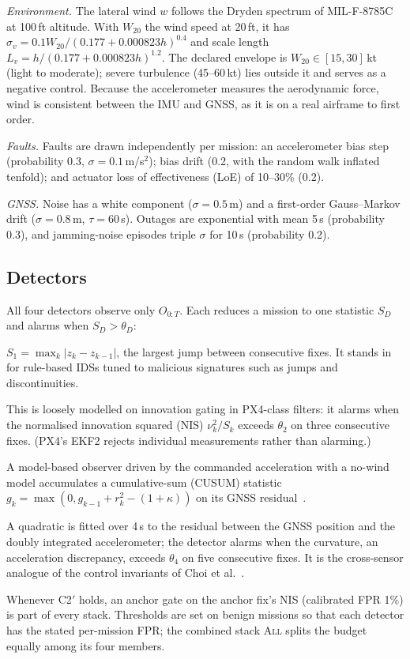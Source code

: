 \documentclass[letterpaper,twocolumn,10pt]{article}
\theoremstyle{remark}
\begin{document}
\emph{Environment.} The lateral wind $w$ follows the Dryden spectrum of
MIL-F-8785C at 100\,ft altitude. With $W_{20}$ the wind speed at 20\,ft, it has
$\sigma_v=0.1W_{20}/(0.177+0.000823h)^{0.4}$ and scale length
$L_v=h/(0.177+0.000823h)^{1.2}$. The declared envelope is
$W_{20}\in[15,30]$\,kt (light to moderate); severe turbulence (45--60\,kt) lies
outside it and serves as a negative control. Because the accelerometer measures
the aerodynamic force, wind is consistent between the IMU and GNSS, as it is on
a real airframe to first order.

\emph{Faults.} Faults are drawn independently per mission: an accelerometer bias
step (probability 0.3, $\sigma=0.1$\,m/s$^2$); bias drift (0.2, with the random
walk inflated tenfold); and actuator loss of effectiveness (LoE) of 10--30\%
(0.2).

\emph{GNSS.} Noise has a white component ($\sigma=0.5$\,m) and a first-order
Gauss--Markov drift ($\sigma=0.8$\,m, $\tau=60$\,s). Outages are
exponential with mean 5\,s (probability 0.3), and jamming-noise episodes
triple $\sigma$ for 10\,s (probability 0.2).

\subsection{Detectors}
All four detectors observe only $O_{0:T}$. Each reduces a mission to one
statistic $S_D$ and alarms when $S_D>\theta_D$:
\begin{description}[leftmargin=1em,style=nextline]
\item[D1, signature monitor.] $S_1=\max_k|z_k-z_{k-1}|$, the largest jump between
  consecutive fixes. It stands in for rule-based IDSs tuned to malicious
  signatures such as jumps and discontinuities.
\item[D2, $\chi^2$ innovation gate.] This is loosely modelled on innovation
  gating in PX4-class filters: it alarms when the normalised innovation squared
  (NIS) $\nu_k^2/S_k$ exceeds $\theta_2$ on three consecutive fixes. (PX4's EKF2
  rejects individual measurements rather than alarming.)
\item[D3, SAVIOR-style CUSUM.] A model-based observer driven by the commanded
  acceleration with a no-wind model accumulates a cumulative-sum (CUSUM)
  statistic $g_k=\max(0,g_{k-1}+r_k^2-(1+\kappa))$ on its GNSS
  residual~\cite{quinonez2020savior}.
\item[D4, IMU--GNSS invariant.] A quadratic is fitted over 4\,s to the residual
  between the GNSS position and the doubly integrated accelerometer; the
  detector alarms when the curvature, an acceleration discrepancy, exceeds
  $\theta_4$ on five consecutive fixes. It is the cross-sensor analogue of the
  control invariants of Choi et al.~\cite{choi2018}.
\end{description}
Whenever C2$'$ holds, an anchor gate on the anchor fix's NIS (calibrated FPR
1\%) is part of every stack. Thresholds are set on \nCalMissions{} benign
missions so that each detector has the stated per-mission FPR; the combined
stack \textsc{All} splits the budget equally among its four members.
\end{document}
